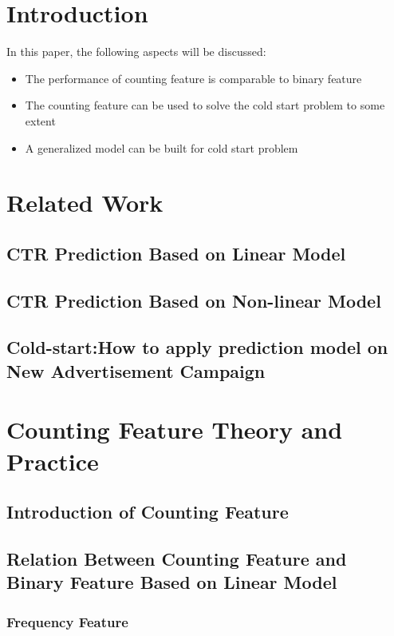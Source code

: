 \documentclass{sig-alternate}
\begin{document}

\keywords{}

\section{Introduction}
In this paper, the following aspects will be discussed:

\begin{itemize}
\item The performance of counting feature is comparable to binary feature
\item The counting feature can be used to solve the cold start problem to some extent
\item A generalized model can be built for cold start problem
\end{itemize}

\section{Related Work}

\subsection{CTR Prediction Based on Linear Model}
\subsection{CTR Prediction Based on Non-linear Model}
\subsection{Cold-start:How to apply prediction model on New Advertisement Campaign}

\section{Counting Feature Theory and Practice}
\subsection{Introduction of Counting Feature}
\subsection{Relation Between Counting Feature and Binary Feature Based on Linear Model}
\subsubsection{Frequency Feature}
\setlength{\parindent}{5ex}
\end{document}
